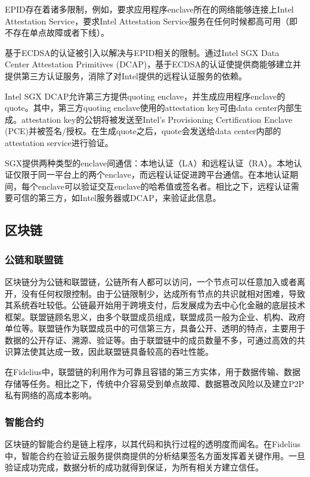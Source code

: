 EPID存在着诸多限制，例如，要求应用程序enclave所在的网络能够连接上Intel Attestation Service，要求Intel Attestation Service服务在任何时候都高可用（即不存在单点故障或者下线）。

基于ECDSA的认证被引入以解决与EPID相关的限制。通过Intel SGX Data Center Attestation Primitives (DCAP)，基于ECDSA的认证使提供商能够建立并提供第三方认证服务，消除了对Intel提供的远程认证服务的依赖。

Intel SGX DCAP允许第三方提供quoting enclave，并生成应用程序enclave的quote。其中，第三方quoting enclave使用的attestation key可由data center内部生成。attestation key的公钥将被发送至Intel's Provisioning Certification Enclave (PCE)并被签名/授权。在生成quote之后，quote会发送给data center内部的attestation service进行验证。

SGX提供两种类型的enclave间通信：本地认证（LA）和远程认证（RA）。本地认证仅限于同一平台上的两个enclave，而远程认证促进跨平台通信。在本地认证期间，每个enclave可以验证交互enclave的哈希值或签名者。相比之下，远程认证需要可信的第三方，如Intel服务器或DCAP，来验证此信息。

\subsection{区块链}
\subsubsection{公链和联盟链}
区块链分为公链和联盟链，公链所有人都可以访问，一个节点可以任意加入或者离开，没有任何权限控制。由于公链限制少，达成所有节点的共识就相对困难，导致其系统吞吐较低。公链最开始用于跨境支付，后发展成为去中心化金融的底层技术框架。联盟链顾名思义，由多个联盟成员组成，联盟成员一般为企业、机构、政府单位等。联盟链作为联盟成员中的可信第三方，具备公开、透明的特点，主要用于数据的公开存证、溯源、验证等。由于联盟链中的成员数量不多，可通过高效的共识算法使其达成一致，因此联盟链具备较高的吞吐性能。

在Fidelius中，联盟链的利用作为可靠且容错的第三方实体，用于数据传输、数据存储等任务。相比之下，传统中介容易受到单点故障、数据篡改风险以及建立P2P私有网络的高成本影响。

\subsubsection{智能合约}
区块链的智能合约是链上程序，以其代码和执行过程的透明度而闻名。在Fidelius中，智能合约在验证云服务提供商提供的分析结果签名方面发挥着关键作用。一旦验证成功完成，数据分析的成功就得到保证，为所有相关方建立信任。 